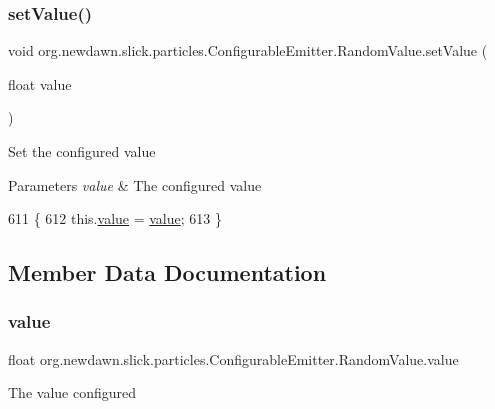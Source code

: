 \subsubsection{\texorpdfstring{set\+Value()}{setValue()}}
{\footnotesize\ttfamily void org.\+newdawn.\+slick.\+particles.\+Configurable\+Emitter.\+Random\+Value.\+set\+Value (\begin{DoxyParamCaption}\item[{float}]{value }\end{DoxyParamCaption})\hspace{0.3cm}{\ttfamily [inline]}}

Set the configured value


\begin{DoxyParams}{Parameters}
{\em value} & The configured value \\
\hline
\end{DoxyParams}

\begin{DoxyCode}
611                                           \{
612             this.\mbox{\hyperlink{classorg_1_1newdawn_1_1slick_1_1particles_1_1_configurable_emitter_1_1_random_value_a79aeb62a3f0873cf7ca46240f9e37d09}{value}} = \mbox{\hyperlink{classorg_1_1newdawn_1_1slick_1_1particles_1_1_configurable_emitter_1_1_random_value_a79aeb62a3f0873cf7ca46240f9e37d09}{value}};
613         \}
\end{DoxyCode}


\subsection{Member Data Documentation}
\mbox{\label{classorg_1_1newdawn_1_1slick_1_1particles_1_1_configurable_emitter_1_1_random_value_a79aeb62a3f0873cf7ca46240f9e37d09}} 
\subsubsection{\texorpdfstring{value}{value}}
{\footnotesize\ttfamily float org.\+newdawn.\+slick.\+particles.\+Configurable\+Emitter.\+Random\+Value.\+value\hspace{0.3cm}{\ttfamily [private]}}

The value configured 